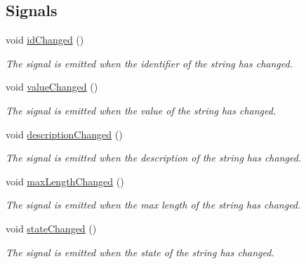 \subsection*{Signals}
\begin{DoxyCompactItemize}
\item 
\mbox{\label{classString_a96493c66757b6aa5a5ac45c245d84740}} 
void \mbox{\hyperlink{classString_a96493c66757b6aa5a5ac45c245d84740}{id\+Changed}} ()
\begin{DoxyCompactList}\small\item\em The signal is emitted when the identifier of the string has changed. \end{DoxyCompactList}\item 
\mbox{\label{classString_aa0c62ee31f5e0e91b8f68a13405db51b}} 
void \mbox{\hyperlink{classString_aa0c62ee31f5e0e91b8f68a13405db51b}{value\+Changed}} ()
\begin{DoxyCompactList}\small\item\em The signal is emitted when the value of the string has changed. \end{DoxyCompactList}\item 
\mbox{\label{classString_ada21cf632b6350cd959efc3b7c0a1b5f}} 
void \mbox{\hyperlink{classString_ada21cf632b6350cd959efc3b7c0a1b5f}{description\+Changed}} ()
\begin{DoxyCompactList}\small\item\em The signal is emitted when the description of the string has changed. \end{DoxyCompactList}\item 
\mbox{\label{classString_ae48fd165246597a387bcdc86aede6899}} 
void \mbox{\hyperlink{classString_ae48fd165246597a387bcdc86aede6899}{max\+Length\+Changed}} ()
\begin{DoxyCompactList}\small\item\em The signal is emitted when the max length of the string has changed. \end{DoxyCompactList}\item 
\mbox{\label{classString_a9ffcae019b2cfb3a5e75ba4d390d725b}} 
void \mbox{\hyperlink{classString_a9ffcae019b2cfb3a5e75ba4d390d725b}{state\+Changed}} ()
\begin{DoxyCompactList}\small\item\em The signal is emitted when the state of the string has changed. \end{DoxyCompactList}\item 

\end{DoxyCompactItemize}
